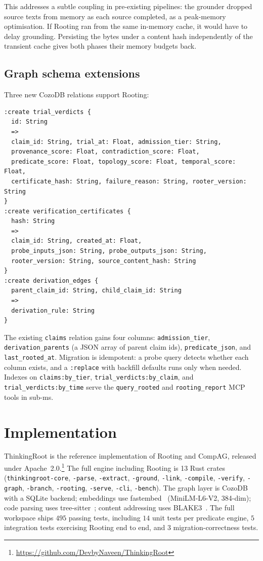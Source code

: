 \documentclass[10pt,a4paper]{article}
\begin{document}
This addresses a subtle coupling in pre-existing pipelines: the grounder
dropped source texts from memory as each source completed, as a peak-memory
optimisation. If Rooting ran from the same in-memory cache, it would have
to delay grounding. Persisting the bytes under a content hash
independently of the transient cache gives both phases their memory
budgets back.

\subsection{Graph schema extensions}

Three new CozoDB relations support Rooting:

\begin{lstlisting}
:create trial_verdicts {
  id: String
  =>
  claim_id: String, trial_at: Float, admission_tier: String,
  provenance_score: Float, contradiction_score: Float,
  predicate_score: Float, topology_score: Float, temporal_score: Float,
  certificate_hash: String, failure_reason: String, rooter_version: String
}
:create verification_certificates {
  hash: String
  =>
  claim_id: String, created_at: Float,
  probe_inputs_json: String, probe_outputs_json: String,
  rooter_version: String, source_content_hash: String
}
:create derivation_edges {
  parent_claim_id: String, child_claim_id: String
  =>
  derivation_rule: String
}
\end{lstlisting}

The existing \texttt{claims} relation gains four columns:
\texttt{admission\_tier}, \texttt{derivation\_parents} (a JSON array of
parent claim ids), \texttt{predicate\_json}, and
\texttt{last\_rooted\_at}. Migration is idempotent: a probe query
detects whether each column exists, and a \texttt{:replace} with backfill
defaults runs only when needed. Indexes on \texttt{claims:by\_tier},
\texttt{trial\_verdicts:by\_claim}, and \texttt{trial\_verdicts:by\_time}
serve the \texttt{query\_rooted} and \texttt{rooting\_report} MCP tools
in sub-ms.

\section{Implementation}
\label{sec:impl}

ThinkingRoot is the reference implementation of Rooting and CompAG, released
under Apache~2.0.\footnote{\url{https://github.com/DevbyNaveen/ThinkingRoot}}
The full engine including Rooting is 13 Rust crates
(\texttt{thinkingroot-core}, \texttt{-parse}, \texttt{-extract},
\texttt{-ground}, \texttt{-link}, \texttt{-compile}, \texttt{-verify},
\texttt{-graph}, \texttt{-branch}, \texttt{-rooting}, \texttt{-serve},
\texttt{-cli}, \texttt{-bench}). The graph layer is
CozoDB~\cite{cozodb} with a SQLite backend; embeddings use
fastembed~\cite{fastembed} (MiniLM-L6-V2, 384-dim); code parsing uses
tree-sitter~\cite{treesitter}; content addressing uses
BLAKE3~\cite{blake3}. The full workspace ships $495$ passing tests,
including $14$ unit tests per predicate engine, $5$ integration tests
exercising Rooting end to end, and $3$ migration-correctness tests.
\end{document}
